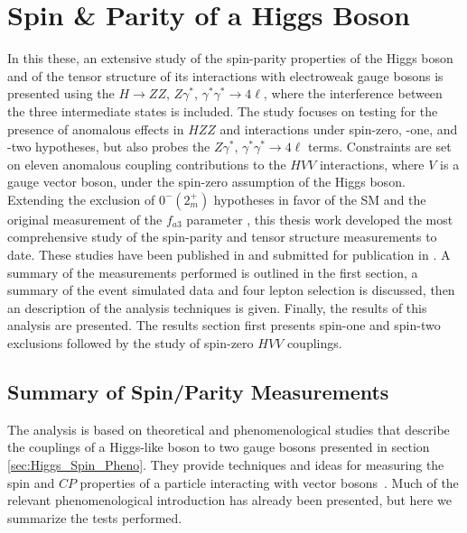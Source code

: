 \chapter{Spin \& Parity of a Higgs Boson}
\label{sec:Spin_Experiment}

In this these, an extensive study of the spin-parity properties of the Higgs boson and of the tensor structure of its interactions with electroweak gauge bosons is presented using the $H \to ZZ$, $Z\gamma^*$, $\gamma^*\gamma^*\to4\ell$, where the interference between the three intermediate states is included. The study focuses on testing for the presence of anomalous effects in $HZZ$ and interactions under spin-zero, -one, and -two hypotheses, but also probes the $Z\gamma^*$, $\gamma^*\gamma^*\to4\ell$ terms. Constraints are set on eleven anomalous coupling contributions to the $HVV$ interactions, where $V$ is a gauge vector boson, under the spin-zero assumption of the Higgs boson. Extending the exclusion of $0^{-}\left(2_{m}^{+}\right)$ hypotheses in favor of the SM and the original measurement of the $f_{a3}$ parameter \cite{Chatrchyan:2012jja}, this thesis work developed the most comprehensive study of the spin-parity and tensor structure measurements to date. These studies have been published in \cite{Chatrchyan:2013mxa} and submitted for publication in \cite{Khachatryan:2014kca}. A summary of the measurements performed is outlined in the first section, a summary of the event simulated data and four lepton selection is discussed, then an description of the analysis techniques is given. Finally, the results of this analysis are presented. The results section first presents spin-one and spin-two exclusions followed by the study of spin-zero $HVV$ couplings.

\section{Summary of Spin/Parity Measurements}
\label{sec:General_Spin_Parity}

The analysis is based on theoretical and phenomenological studies that describe the couplings of a Higgs-like boson to two gauge bosons presented in section \ref{sec:Higgs_Spin_Pheno}. They provide techniques and ideas for measuring the spin and $CP$ properties of a particle interacting with vector bosons~\cite{Gao:2010qx,Bolognesi:2012mm,Anderson:2013afp}. Much of the relevant phenomenological introduction has already been presented, but here we summarize the tests performed.

